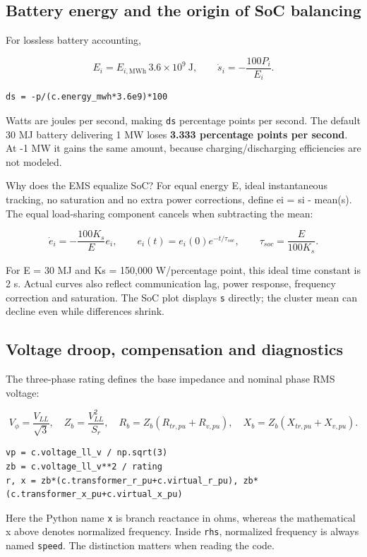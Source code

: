 \documentclass[11pt,a4paper]{article}
\begin{document}
\subsection{Battery energy and the origin of SoC balancing}

For lossless battery accounting,

\[
E_i=E_{i,\mathrm{MWh}}\,3.6\times10^9\ \mathrm{J},\qquad
\dot s_i=-\frac{100P_i}{E_i}.
\]

\begin{lstlisting}
ds = -p/(c.energy_mwh*3.6e9)*100
\end{lstlisting}

Watts are joules per second, making \texttt{ds} percentage points per second. The default 30 MJ battery delivering 1 MW loses \textbf{3.333 percentage points per second}. At -1 MW it gains the same amount, because charging/discharging efficiencies are not modeled.

Why does the EMS equalize SoC? For equal energy E, ideal instantaneous tracking, no saturation and no extra power corrections, define ei = si - mean(s). The equal load-sharing component cancels when subtracting the mean:

\[
\dot e_i=-\frac{100K_s}{E}e_i,\qquad
 e_i(t)=e_i(0)e^{-t/\tau_{soc}},\qquad
\tau_{soc}=\frac{E}{100K_s}.
\]

For E = 30 MJ and Ks = 150,000 W/percentage point, this ideal time constant is 2 s. Actual curves also reflect communication lag, power response, frequency correction and saturation. The SoC plot displays \texttt{s} directly; the cluster mean can decline even while differences shrink.

\subsection{Voltage droop, compensation and diagnostics}

The three-phase rating defines the base impedance and nominal phase RMS voltage:

\[
V_\phi=\frac{V_{LL}}{\sqrt3},\quad Z_b=\frac{V_{LL}^2}{S_r},\quad
R_b=Z_b(R_{tr,pu}+R_{v,pu}),\quad
X_b=Z_b(X_{tr,pu}+X_{v,pu}).
\]

\begin{lstlisting}
vp = c.voltage_ll_v / np.sqrt(3)
zb = c.voltage_ll_v**2 / rating
r, x = zb*(c.transformer_r_pu+c.virtual_r_pu), zb*(c.transformer_x_pu+c.virtual_x_pu)
\end{lstlisting}

Here the Python name \texttt{x} is branch reactance in ohms, whereas the mathematical x above denotes normalized frequency. Inside \texttt{rhs}, normalized frequency is always named \texttt{speed}. The distinction matters when reading the code.
\end{document}
